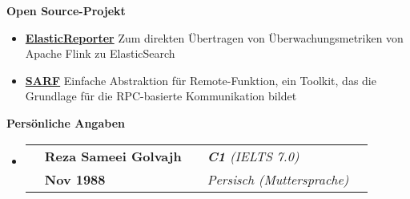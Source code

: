 \documentclass[letterpaper,12pt]{article}[leftmargin=*]
\makeatletter
\def \entryspacing {-0pt}
\renewcommand{\section}[2]{\vspace{5pt}
  \colorbox{secondary}{\color{white}\raggedbottom\normalsize\textbf{{#1}{\hspace{7pt}#2}}}
}
\newcommand{\resumeEntryStart}{\begin{itemize}[leftmargin=2.5mm]}
\newcommand{\resumeEntryEnd}{\end{itemize}\vspace{\entryspacing}}
\newcommand{\aboutMeEntryTSDL}[4]{
  \vspace{-1pt}\item[]
    \begin{tabular*}{0.97\textwidth}{l@{\extracolsep{\fill}}lrlr}
	  \color{primary}{Vor- und Familienname} & \textbf{\color{accent}#1} &
	  \color{primary}{Englisch fließend} & \textit{\color{accent}#3} \\
	  \color{primary}{Geburtsdatum} & \textbf{\color{accent}#2} &
	  \color{primary}{Andere Sprachen} & \textit{\color{accent}#4} \\
    \end{tabular*}\vspace{-6pt}
}
\newcommand{\resumeEntryS}[2]{
  \item[]\small{
    \textbf{\color{primary}#1 }{ #2 \vspace{-6pt}}
  }
}
\makeatother
\begin{document}
\section{\faFolderOpen}{Open Source-Projekt}
	\resumeEntryStart
		\resumeEntryS{\href{https://github.com/sameei/elasticreporter}{ElasticReporter}} {Zum direkten Übertragen von Überwachungsmetriken von Apache Flink zu ElasticSearch}
		\resumeEntryS{\href{https://github.com/sameei/SARF}{SARF}} {Einfache Abstraktion für Remote-Funktion, ein Toolkit, das die Grundlage für die RPC-basierte Kommunikation bildet}
	\resumeEntryEnd
	

\section{\faUser}{Persönliche Angaben}
    \resumeEntryStart
      \aboutMeEntryTSDL
	  	{Reza Sameei Golvajh}{Nov 1988}{\textbf{C1} (IELTS 7.0)}{Persisch (Muttersprache)}
    \resumeEntryEnd
  
\end{document}
